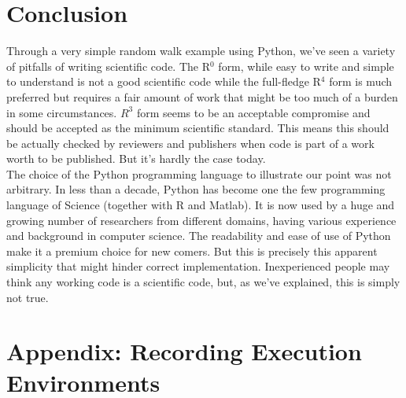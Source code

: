 \documentclass[a4paper,11pt]{article}
\begin{document}
\section*{Conclusion}

Through a very simple random walk example using Python, we've seen a variety of pitfalls of writing scientific code. The R$^0$ form, while easy to write and simple to understand is not a good scientific code while the full-fledge R$^{4}$ form is much preferred but requires a fair amount of work that might be too much of a burden in some circumstances. $R^3$ form seems to be an acceptable compromise and should be accepted as the minimum scientific standard. This means this should be actually checked by reviewers and publishers when code is part of a work worth to be published. But it's hardly the case today.\\

The choice of the Python programming language to illustrate our point was not arbitrary. In less than a decade, Python has become one the few programming language of Science (together with R and Matlab). It is now used by a huge and growing number of researchers from different domains, having various experience and background in computer science. The readability and ease of use of Python make it a premium choice for new comers. But this is precisely this apparent simplicity that might hinder correct implementation. Inexperienced people may think any working code is a scientific code, but, as we've explained, this is simply not true.




\renewcommand*{\bibfont}{\small}
\printbibliography[title=References]

\newpage 
\appendix
\section{Appendix: Recording Execution Environments}
\label{appendix:executionenvs}

\end{document}
